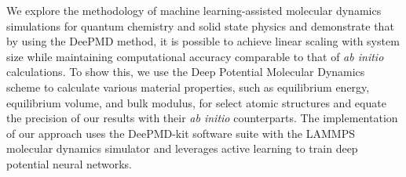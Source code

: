 We explore the methodology of machine learning-assisted molecular dynamics
simulations for quantum chemistry and solid state physics and demonstrate that
by using the DeePMD method, it is possible to achieve linear scaling with
system size while maintaining computational accuracy comparable to that of
\textit{ab initio} calculations. To show this, we use the Deep Potential
Molecular Dynamics scheme to calculate various material properties, such as
equilibrium energy, equilibrium volume, and bulk modulus, for select atomic
structures and equate the precision of our results with their
\textit{ab initio} counterparts. The implementation of our approach uses the
DeePMD-kit software suite with the LAMMPS molecular dynamics simulator and
leverages active learning to train deep potential neural networks.
